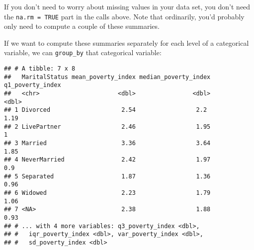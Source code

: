 \documentclass[]{article}
\newenvironment{Shaded}{\begin{snugshade}}{\end{snugshade}}
\newcommand{\KeywordTok}[1]{\textcolor[rgb]{0.13,0.29,0.53}{\textbf{#1}}}
\newcommand{\DataTypeTok}[1]{\textcolor[rgb]{0.13,0.29,0.53}{#1}}
\newcommand{\FloatTok}[1]{\textcolor[rgb]{0.00,0.00,0.81}{#1}}
\newcommand{\StringTok}[1]{\textcolor[rgb]{0.31,0.60,0.02}{#1}}
\newcommand{\OtherTok}[1]{\textcolor[rgb]{0.56,0.35,0.01}{#1}}
\newcommand{\OperatorTok}[1]{\textcolor[rgb]{0.81,0.36,0.00}{\textbf{#1}}}
\newcommand{\NormalTok}[1]{#1}
\begin{document}
If you don't need to worry about missing values in your data set, you
don't need the \texttt{na.rm\ =\ TRUE} part in the calls above. Note
that ordinarily, you'd probably only need to compute a couple of these
summaries.

If we want to compute these summaries separately for each level of a
categorical variable, we can \texttt{group\_by} that categorical
variable:

\begin{Shaded}
\end{Shaded}

\begin{verbatim}
## # A tibble: 7 x 8
##   MaritalStatus mean_poverty_index median_poverty_index q1_poverty_index
##   <chr>                      <dbl>                <dbl>            <dbl>
## 1 Divorced                    2.54                 2.2              1.19
## 2 LivePartner                 2.46                 1.95             1   
## 3 Married                     3.36                 3.64             1.85
## 4 NeverMarried                2.42                 1.97             0.9 
## 5 Separated                   1.87                 1.36             0.96
## 6 Widowed                     2.23                 1.79             1.06
## 7 <NA>                        2.38                 1.88             0.93
## # ... with 4 more variables: q3_poverty_index <dbl>,
## #   iqr_poverty_index <dbl>, var_poverty_index <dbl>,
## #   sd_poverty_index <dbl>
\end{verbatim}
\end{document}
